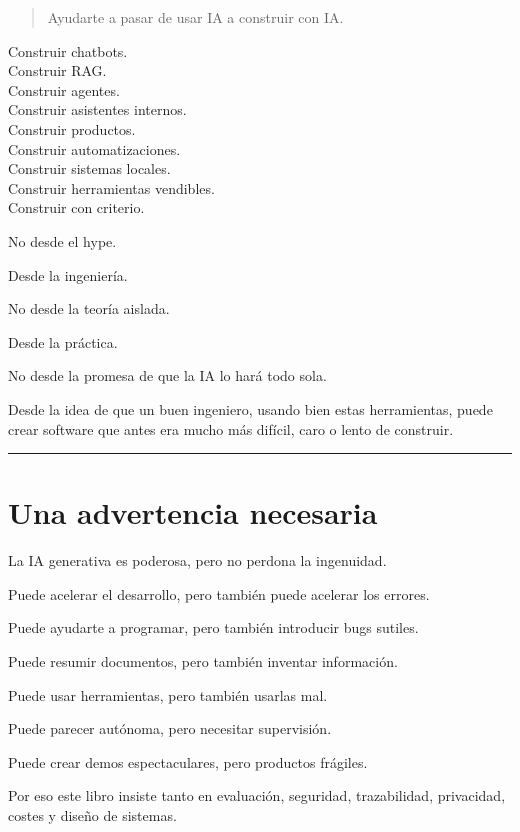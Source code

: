 \begin{quote}
Ayudarte a pasar de usar IA a construir con IA.
\end{quote}

Construir chatbots.\\
Construir RAG.\\
Construir agentes.\\
Construir asistentes internos.\\
Construir productos.\\
Construir automatizaciones.\\
Construir sistemas locales.\\
Construir herramientas vendibles.\\
Construir con criterio.

No desde el hype.

Desde la ingeniería.

No desde la teoría aislada.

Desde la práctica.

No desde la promesa de que la IA lo hará todo sola.

Desde la idea de que un buen ingeniero, usando bien estas herramientas,
puede crear software que antes era mucho más difícil, caro o lento de
construir.

\begin{center}\rule{0.5\linewidth}{0.5pt}\end{center}

\section{Una advertencia necesaria}\label{una-advertencia-necesaria}

La IA generativa es poderosa, pero no perdona la ingenuidad.

Puede acelerar el desarrollo, pero también puede acelerar los errores.

Puede ayudarte a programar, pero también introducir bugs sutiles.

Puede resumir documentos, pero también inventar información.

Puede usar herramientas, pero también usarlas mal.

Puede parecer autónoma, pero necesitar supervisión.

Puede crear demos espectaculares, pero productos frágiles.

Por eso este libro insiste tanto en evaluación, seguridad, trazabilidad,
privacidad, costes y diseño de sistemas.

